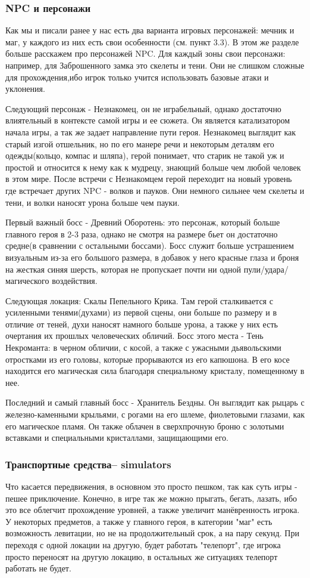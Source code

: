 \documentclass{article}
\begin{document}
\subsubsection{NPC и персонажи}
Как мы и писали ранее у нас есть два варианта игровых персонажей: мечник и маг, у каждого из них есть свои особенности (см. пункт 3.3). В этом же разделе больше расскажем про персонажей NPC. Для каждый зоны свои персонажи: например, для Заброшенного замка это скелеты и тени. Они не слишком сложные для прохождения,ибо игрок только учится использовать  базовые атаки и уклонения.\par
Следующий персонаж - Незнакомец, он не играбельный, однако достаточно влиятельный в контексте самой игры и ее сюжета. Он является катализатором начала игры, а так же задает направление пути героя. Незнакомец выглядит как старый изгой отшельник, но по его манере речи и некоторым деталям его одежды(кольцо, компас и шляпа), герой понимает, что старик не такой уж и простой и относится к нему как  к мудрецу, знающий больше чем любой человек в этом мире. После встречи с Незнакомцем герой переходит на новый уровень где встречает других NPC -  волков и пауков. Они немного сильнее чем скелеты и тени, и волки наносят урона больше чем пауки. \par
Первый важный босс - Древний Оборотень: это персонаж, который больше главного героя в 2-3 раза, однако не смотря на размере бьет он достаточно средне(в сравнении с остальными боссами). Босс служит больше устрашением визуальным из-за его большого размера, в добавок у него красные глаза и броня на жесткая синяя шерсть, которая не пропускает почти ни одной пули/удара/магического воздействия. \par
Следующая локация: Скалы Пепельного Крика. Там герой сталкивается с усиленными тенями(духами) из первой сцены, они больше по размеру и в отличие от теней, духи наносят намного больше урона, а также у них есть очертания их прошлых человеческих обличий. Босс этого места - Тень
Некроманта: в черном обличии, с косой, а также с ужасными дьявольскими отростками из его головы, которые прорываются из его капюшона. В его косе находится его магическая сила благодаря специальному кристалу, помещенному в нее.\par
Последний и самый главный босс - Хранитель Бездны. Он выглядит как рыцарь с железно-каменными крыльями, с рогами на его шлеме, фиолетовыми глазами, как его магическое пламя. Он также облачен в сверхпрочную броню с золотыми вставками и специальными кристаллами, защищающими его.
\subsubsection{Транспортные средства– simulators}
Что касается передвижения, в основном это просто пешком, так как суть игры - пешее приключение. Конечно, в игре так же можно прыгать, бегать, лазать, ибо это все облегчит прохождение уровней, а также увеличит манёвренность игрока. У некоторых предметов, а также у главного героя, в категории "маг" есть возможность левитации, но не на продолжительный срок, а на пару секунд. При переходя с одной локации на другую, будет работать "телепорт", где игрока просто переносят на другую локацию, в остальных же ситуациях телепорт работать не будет.\par
\end{document}
